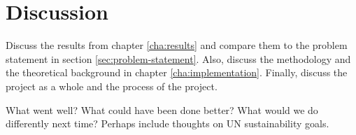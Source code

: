 \chapter{Discussion}\label{cha:discussion}
Discuss the results from chapter \ref{cha:results} and compare them to the problem statement in section \ref{sec:problem-statement}. Also, discuss the methodology and the theoretical background in chapter \ref{cha:implementation}. Finally, discuss the project as a whole and the process of the project.

What went well? What could have been done better? What would we do differently next time? Perhaps include thoughts on UN sustainability goals.